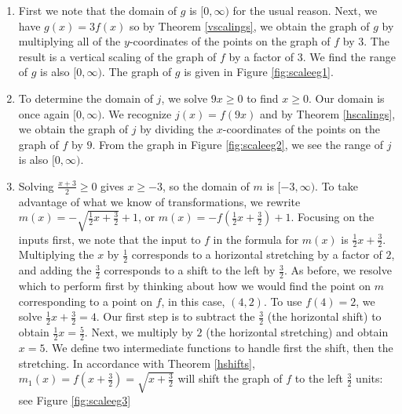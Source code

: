 {
\begin{enumerate}

\item  First we note that the domain of $g$ is $[0, \infty)$ for the usual reason.  Next, we have $g(x) = 3 f(x)$ so by Theorem \ref{vscalings}, we obtain the graph of $g$ by multiplying all of the $y$-coordinates of the points on the graph of $f$ by $3$.  The result is a vertical scaling of the graph of $f$ by a factor of $3$.  We find the range of $g$ is also $[0, \infty)$. The graph of $g$ is given in Figure \ref{fig:scaleeg1}.

\item  To determine the domain of $j$, we solve $9x \geq 0$ to find $x \geq 0$. Our domain is once again $[0,\infty)$.   We recognize $j(x) = f(9x)$ and by Theorem \ref{hscalings}, we obtain the graph of $j$ by dividing the $x$-coordinates of the points on the graph of $f$ by $9$.  From the graph in Figure \ref{fig:scaleeg2}, we see the range of $j$ is also $[0,\infty)$.



\item  Solving $\frac{x+3}{2} \geq 0$ gives $x \geq -3$, so the domain of $m$ is $[-3, \infty)$.  To take advantage of what we know of transformations, we rewrite $m(x) = - \sqrt{\frac{1}{2} x + \frac{3}{2}} + 1$, or $m(x) =- f\left(\frac{1}{2} x + \frac{3}{2}\right) + 1$.   Focusing on the inputs first, we note that the input to $f$ in the formula for $m(x)$ is $\frac{1}{2} x + \frac{3}{2}$.  Multiplying the $x$ by $\frac{1}{2}$ corresponds to a horizontal stretching by a factor of $2$, and adding the $\frac{3}{2}$ corresponds to a shift to the left by $\frac{3}{2}$.  As before, we resolve which to perform first by thinking about how we would find the point on $m$ corresponding to a point on $f$, in this case, $(4,2)$.  To use $f(4) = 2$, we solve $\frac{1}{2} x + \frac{3}{2} = 4$.  Our first step is to subtract the $\frac{3}{2}$ (the horizontal shift) to obtain $\frac{1}{2} x = \frac{5}{2}$.  Next, we multiply by $2$ (the horizontal stretching) and obtain $x = 5$.  We define two intermediate functions to handle first the shift, then the stretching.  In accordance with Theorem \ref{hshifts},  $m_{1}(x) = f\left(x+ \frac{3}{2}\right) = \sqrt{x+\frac{3}{2}}$ will shift the graph of $f$ to the left $\frac{3}{2}$ units: see Figure \ref{fig:scaleeg3}



\end{enumerate}}
